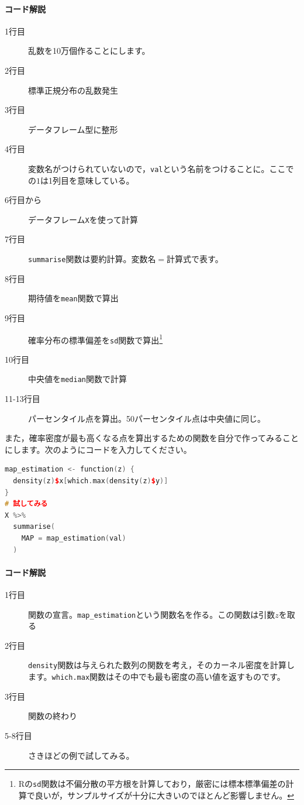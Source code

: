\documentclass{ltjsbook}
\begin{document}
\paragraph{コード解説}
\begin{description}
  \item[1行目] 乱数を10万個作ることにします。
  \item[2行目] 標準正規分布の乱数発生
  \item[3行目] データフレーム型に整形
  \item[4行目] 変数名がつけられていないので，\texttt{val}という名前をつけることに。ここでの$1$は1列目を意味している。
  \item[6行目から] データフレーム\texttt{X}を使って計算
  \item[7行目] \texttt{summarise}関数は要約計算。変数名$=$計算式で表す。
  \item[8行目] 期待値を\texttt{mean}関数で算出
  \item[9行目] 確率分布の標準偏差を\texttt{sd}関数で算出\footnote{Rの\texttt{sd}関数は不偏分散の平方根を計算しており，厳密には標本標準偏差の計算で良いが，サンプルサイズが十分に大きいのでほとんど影響しません。}
  \item[10行目] 中央値を\texttt{median}関数で計算
  \item[11-13行目] パーセンタイル点を算出。50パーセンタイル点は中央値に同じ。
\end{description}

また，確率密度が最も高くなる点を算出するための関数を自分で作ってみることにします。次のようにコードを入力してください。
\begin{lstlisting}[language=c++,label={code:17_07},caption={確率分布の要約}]
map_estimation <- function(z) {
  density(z)$x[which.max(density(z)$y)]
}
# 試してみる
X %>%
  summarise(
    MAP = map_estimation(val)
  )

\end{lstlisting}
\paragraph{コード解説}
\begin{description}
  \item[1行目] 関数の宣言。\verb|map_estimation|という関数名を作る。この関数は引数$z$を取る
  \item[2行目] \texttt{density}関数は与えられた数列の関数を考え，そのカーネル密度を計算します。\texttt{which.max}関数はその中でも最も密度の高い値を返すものです。
  \item[3行目] 関数の終わり
  \item[5-8行目] さきほどの例で試してみる。
\end{description}
\end{document}

